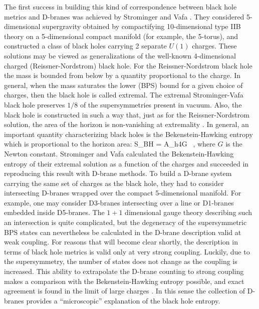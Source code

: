 The first success in building this kind of correspondence between
black hole metrics and D-branes was achieved by Strominger and Vafa
\cite{SV}. They considered 5-dimensional
supergravity obtained by compactifying 10-dimensional type IIB theory
on a 5-dimensional compact manifold (for example, the 5-torus), 
and constructed a class of black holes carrying
2 separate $U(1)$ charges. These solutions may be viewed as generalizations
of the well-known 4-dimensional charged (Reissner-Nordstrom) black hole.
For the Reissner-Nordstrom black hole the mass
is bounded from below by a quantity proportional to the charge.
In general, when the mass saturates the lower (BPS)
bound for a given choice
of charges, then the black hole is called extremal.
The extremal Strominger-Vafa black hole
preserves $1/8$ of the supersymmetries present in vacuum.
Also, the black hole is constructed
in such a way that, just as for the Reissner-Nordstrom solution, 
the area of the
horizon is non-vanishing at extremality . 
In general, an important quantity characterizing
black holes is the Bekenstein-Hawking entropy which is proportional
to the horizon area:
\be S_{BH} = {A_h\over 4G}
\ ,
\ee
where $G$ is the Newton constant.
Strominger and Vafa calculated the Bekenstein-Hawking entropy of their
extremal solution as a function of the charges and succeeded in reproducing
this result with D-brane methods. To build a D-brane system carrying the 
same set of charges as the black hole, they had to consider intersecting
D-branes wrapped over the compact 5-dimensional manifold. 
For example, one may consider D3-branes intersecting over a line or
D1-branes embedded inside D5-branes. The $1+1$ dimensional gauge theory
describing such an intersection is quite complicated, but the degeneracy
of the supersymmetric BPS states can nevertheless be calculated in the
D-brane description valid at weak coupling. 
For reasons that will become clear shortly,
the description in terms of black hole metrics is valid only at very
strong coupling. Luckily, due to the supersymmetry,
the number of states does not change as the coupling is increased.
This ability to extrapolate the D-brane counting to strong coupling
makes a comparison with the Bekenstein-Hawking entropy possible,
and exact agreement is found in the limit of large charges \cite{SV}.
In this sense the collection of D-branes provides a ``microscopic''
explanation of the black hole entropy.

